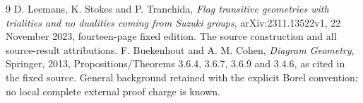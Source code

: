 \documentclass[11pt,a4paper]{article}
\begin{document}
\begin{thebibliography}{9}
 D. Leemans, K. Stokes and P. Tranchida,
\emph{Flag transitive geometries with trialities and no dualities coming
from Suzuki groups}, arXiv:2311.13522v1, 22 November 2023, fourteen-page
fixed edition. The source construction and all source-result attributions.
 F. Buekenhout and A. M. Cohen, \emph{Diagram Geometry},
Springer, 2013, Propositions/Theorems 3.6.4, 3.6.7, 3.6.9 and 3.4.6,
as cited in the fixed source. General background retained with the
explicit Borel convention; no local complete external proof charge is known.
\end{thebibliography}
\end{document}
